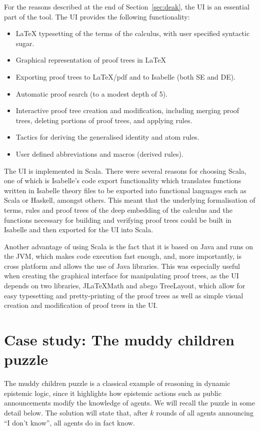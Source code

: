 \documentclass[runningheads,a4paper]{llncs}
\begin{document}
For the reasons described at the end of Section~\ref{sec:deak}, the UI is an essential part of the tool. The UI provides the following functionality:
\begin{itemize}
\item
    LaTeX typesetting of the terms of the calculus, with user specified syntactic sugar.
\item
    Graphical representation of proof trees in LaTeX
\item
    Exporting proof trees to LaTeX/pdf and to Isabelle (both SE and DE).
\item
    Automatic proof search (to a modest depth of 5).
\item
    Interactive proof tree creation and modification, including merging proof trees, deleting portions of proof trees, and applying rules. 
\item Tactics for deriving the generalised identity and atom rules.
\item User defined abbreviations and macros (derived rules). 
\end{itemize}
\noindent
The UI is implemented in Scala. There were several reasons for choosing Scala, one of which is Isabelle's code export functionality which translates functions written in Isabelle theory files to be exported into functional languages such as Scala or Haskell, amongst others. This meant that the underlying formalisation of terms, rules and proof trees of the deep embedding of the calculus and the functions necessary for building and verifying proof trees could be built in Isabelle and then exported for the UI into Scala.

Another advantage of using Scala is the fact that it is based on Java and runs on the JVM, which makes code execution fast enough, and, more importantly,  is cross platform and allows the use of Java libraries. This was especially useful when creating the graphical interface for manipulating proof trees, as the UI depends on two libraries, JLaTeXMath
and abego TreeLayout, which allow for easy typesetting and pretty-printing of the proof trees as well as simple visual creation and modification of proof trees in the UI.

\section{Case study: The muddy children puzzle}\label{sec:mc}

The muddy children puzzle is a classical example of reasoning in dynamic epistemic logic, since it highlights how epistemic actions such as public announcements modify the knowledge of agents. We will recall the puzzle  in some detail below. The solution will state that, after $k$ rounds of all agents announcing ``I don't know'', all agents do in fact know.
\end{document}
